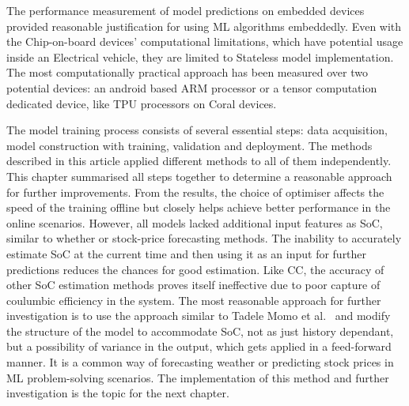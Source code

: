 %
%
The performance measurement of model predictions on embedded devices provided reasonable justification for using ML algorithms embeddedly.
Even with the Chip-on-board devices' computational limitations, which have potential usage inside an Electrical vehicle, they are limited to Stateless model implementation.
The most computationally practical approach has been measured over two potential devices: an android based ARM processor or a tensor computation dedicated device, like TPU processors on Coral devices.

%
%
The model training process consists of several essential steps: data acquisition, model construction with training, validation and deployment.
The methods described in this article applied different methods to all of them independently.
This chapter summarised all steps together to determine a reasonable approach for further improvements.
From the results, the choice of optimiser affects the speed of the training offline but closely helps achieve better performance in the online scenarios.
However, all models lacked additional input features as SoC, similar to whether or stock-price forecasting methods.
The inability to accurately estimate SoC at the current time and then using it as an input for further predictions reduces the chances for good estimation.
Like CC, the accuracy of other SoC estimation methods proves itself ineffective due to poor capture of coulumbic efficiency in the system.
The most reasonable approach for further investigation is to use the approach similar to Tadele Momo et al.~\cite{mamo_long_2020} and modify the structure of the model to accommodate SoC, not as just history dependant, but a possibility of variance in the output, which gets applied in a feed-forward manner.
It is a common way of forecasting weather or predicting stock prices in ML problem-solving scenarios. The implementation of this method and further investigation is the topic for the next chapter.